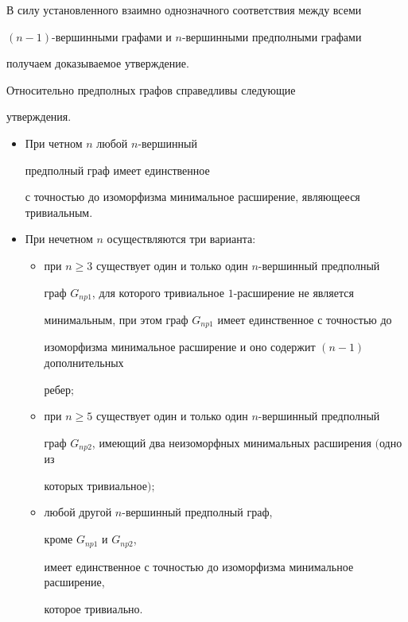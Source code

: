 В силу установленного взаимно однозначного соответствия между всеми


$(n-1)$-вершинными графами и $n$-вершинными предполными графами


получаем доказываемое утверждение.





\begin{thm}


Относительно предполных графов справедливы следующие


утверждения.


\begin{itemize}


\item[1.] При четном $n$ любой $n$-вершинный 


предполный граф имеет единственное


с точностью до изоморфизма минимальное расширение, являющееся тривиальным.


\item[2.] При нечетном $n$ осуществляются три варианта${:}$


\begin{itemize}


\item[а)] при $n\ge3$ существует один и только один $n$-вершинный предполный


граф $G_{np1}$, для которого тривиальное $1$-расширение не является


минимальным, при этом граф $G_{np1}$ имеет единственное с точностью до


изоморфизма минимальное расширение и оно содержит $(n-1)$ дополнительных


ребер$;$


\item[б)] при $n\ge5$ существует один и только один $n$-вершинный предполный


граф $G_{np2}$, имеющий два неизоморфных минимальных расширения $($одно из


которых три\-ви\-альн\-ое$);$


\item[в)] любой другой $n$-вершинный предполный граф,


кроме $G_{np1}$ и $G_{np2}$,


имеет единственное с точностью до изоморфизма минимальное расширение,


которое тривиально.


\end{itemize}


\end{itemize}


\end{thm}





